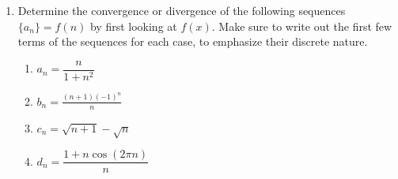 \documentclass[11pt]{article}
\begin{document}
\begin{enumerate}
        \vfill
        \newpage
        \item Determine the convergence or divergence of the following sequences $\{a_{n}\}=f(n)$ by first looking at $f(x)$. Make sure to write out the first few terms of the sequences for each case, to emphasize their discrete nature.
        \begin{enumerate}
            \item $a_{n}=\dfrac{n}{1+n^{2}}$\vfill
            \item $b_{n}=\frac{(n+1)(-1)^{n}}{n}$\vfill
            \newpage
            \item $c_{n}=\sqrt{n+1}-\sqrt{n}$\vfill
            \item $d_{n}=\dfrac{1+n\cos(2\pi n)}{n}$\vfill
        \end{enumerate}
        
    \end{enumerate}
\end{document}
